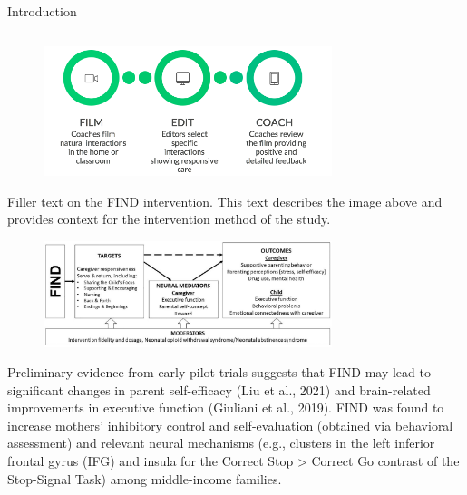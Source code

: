 \documentclass[final]{beamer}
\begin{document}
\begin{frame}[t]
\begin{columns}[t]
\begin{column}{\textwidth}
  \vspace{-15pt}
  \begin{block}{Introduction}
    \begin{columns}[t]
      \begin{column}{0.48\textwidth}
        \begin{figure}[ht]
          \centering
          \includegraphics[clip, width=0.75\textwidth]{find.png}
          \label{fig:find}
        \end{figure}
        Filler text on the FIND intervention. This text describes the image above and provides context for the intervention method of the study.

        \begin{figure}[ht]
          \centering
          \includegraphics[clip, width=0.75\textwidth]{model.png}
          \label{fig:model}
        \end{figure}
        Preliminary evidence from early pilot trials suggests that FIND may lead to significant changes in parent self-efficacy (Liu et al., 2021) and brain-related improvements in executive function (Giuliani et al., 2019). FIND was found to increase mothers’ inhibitory control and self-evaluation (obtained via behavioral assessment) and relevant neural mechanisms (e.g., clusters in the left inferior frontal gyrus (IFG) and insula for the Correct Stop > Correct Go contrast of the Stop-Signal Task) among middle-income families.  
      \end{column}


\end{columns}
\end{block}
\end{column}
\end{columns}
\end{frame}
\end{document}
